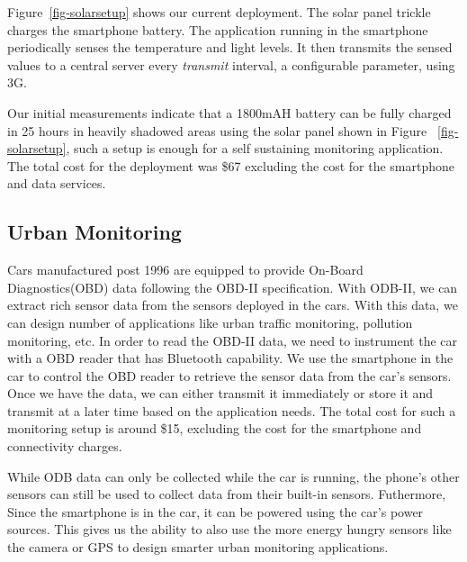 Figure~\ref{fig-solarsetup} shows our current deployment. The solar panel trickle
charges the smartphone battery. The application running in the smartphone
periodically senses the temperature and light levels. It then transmits the
sensed values to a central server every \textit{transmit} interval, a
configurable parameter, using 3G. 

Our initial measurements indicate that a 1800mAH battery can be fully charged
in 25
hours in heavily shadowed areas using the solar panel shown in Figure 
~\ref{fig-solarsetup}, such a setup is
enough for a self sustaining monitoring application. The total cost for the
deployment was \$67 excluding the cost for the smartphone and data services.

\subsection{Urban Monitoring}
Cars manufactured post 1996 are equipped to provide On-Board Diagnostics(OBD)
data following the OBD-II specification. With ODB-II, we can extract rich
sensor data from the sensors deployed in the cars. With this data, we can design number of
applications like urban traffic monitoring, pollution monitoring, etc. In order to 
read the OBD-II data, we need to instrument the car with a OBD reader that has Bluetooth 
capability. We use the smartphone in the car to control
the OBD reader to retrieve the sensor data from the car's sensors. Once we have
the data, we can either transmit it immediately or store it and transmit at a
later time based on the application needs. The total cost for such a monitoring setup
is around \$15, excluding the cost for the smartphone and connectivity charges.

While ODB data can only be collected while the car is running, the phone's other
sensors can still be used to collect data from their built-in sensors.  Futhermore,
Since the smartphone is in the car, it can be powered using the car's power
sources. This gives us the ability to also use the more energy hungry sensors
like the camera or GPS to design smarter urban monitoring applications. 

